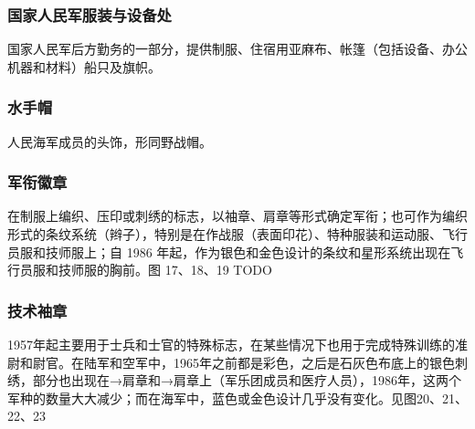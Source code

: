 \subsubsection*{国家人民军服装与设备处}%

国家人民军后方勤务的一部分，提供制服、住宿用亚麻布、帐篷（包括设备、办公机器和材料）船只及旗帜。

\subsubsection*{水手帽}%

人民海军成员的头饰，形同野战帽。

\subsubsection*{军衔徽章}%

在制服上编织、压印或刺绣的标志，以袖章、肩章等形式确定军衔；也可作为编织形式的条纹系统（辫子），特别是在作战服（表面印花）、特种服装和运动服、飞行员服和技师服上；自 1986 年起，作为银色和金色设计的条纹和星形系统出现在飞行员服和技师服的胸前。图 17、18、19  TODO

\subsubsection*{技术袖章}%

1957年起主要用于士兵和士官的特殊标志，在某些情况下也用于完成特殊训练的准尉和尉官。在陆军和空军中，1965年之前都是彩色，之后是石灰色布底上的银色刺绣，部分也出现在→肩章和→肩章上（军乐团成员和医疗人员），1986年，这两个军种的数量大大减少；而在海军中，蓝色或金色设计几乎没有变化。见图20、21、22、23

